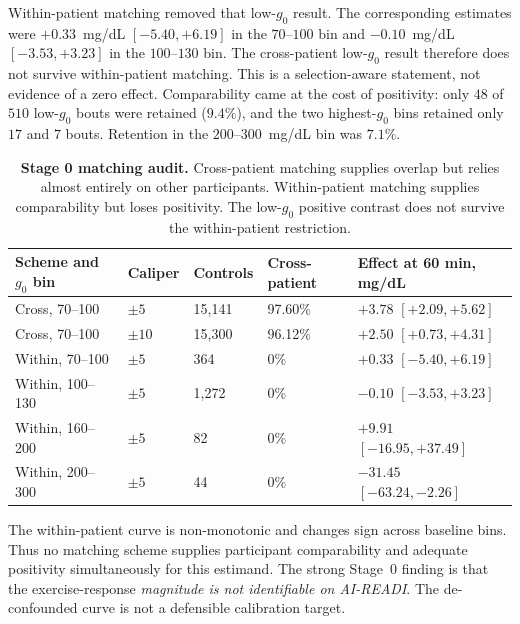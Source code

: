 Within-patient matching removed that low-$g_0$ result. The corresponding
estimates were $+0.33$~mg/dL $[-5.40,+6.19]$ in the $70$--$100$ bin and
$-0.10$~mg/dL $[-3.53,+3.23]$ in the $100$--$130$ bin. The cross-patient
low-$g_0$ result therefore does not survive within-patient matching. This is
a selection-aware statement, not evidence of a zero effect. Comparability
came at the cost of positivity: only $48$ of $510$ low-$g_0$ bouts were
retained ($9.4\%$), and the two highest-$g_0$ bins retained only $17$ and $7$
bouts. Retention in the $200$--$300$~mg/dL bin was $7.1\%$.

\begin{table}[H]
  \centering
  \caption{%
    \textbf{Stage 0 matching audit.}
    Cross-patient matching supplies overlap but relies almost entirely on
    other participants. Within-patient matching supplies comparability but
    loses positivity. The low-$g_0$ positive contrast does not survive the
    within-patient restriction.%
  }
  \label{tab:exercise_stage0}
  \small
  \setlength{\tabcolsep}{3pt}
  \begin{tabular}{lllll}
    \toprule
    Scheme and $g_0$ bin & Caliper & Controls & Cross-patient & Effect at 60 min, mg/dL \\
    \midrule
    Cross, 70--100   & $\pm5$  & 15{,}141 & 97.60\% & $+3.78$ $[+2.09,+5.62]$ \\
    Cross, 70--100   & $\pm10$ & 15{,}300 & 96.12\% & $+2.50$ $[+0.73,+4.31]$ \\
    Within, 70--100  & $\pm5$  & 364       & 0\%     & $+0.33$ $[-5.40,+6.19]$ \\
    Within, 100--130 & $\pm5$  & 1{,}272   & 0\%     & $-0.10$ $[-3.53,+3.23]$ \\
    Within, 160--200 & $\pm5$  & 82        & 0\%     & $+9.91$ $[-16.95,+37.49]$ \\
    Within, 200--300 & $\pm5$  & 44        & 0\%     & $-31.45$ $[-63.24,-2.26]$ \\
    \bottomrule
  \end{tabular}
\end{table}

The within-patient curve is non-monotonic and changes sign across baseline
bins. Thus no matching scheme supplies participant comparability and adequate
positivity simultaneously for this estimand. The strong Stage~0 finding is
that the exercise-response \emph{magnitude is not identifiable on AI-READI}.
The de-confounded curve is not a defensible calibration target.

